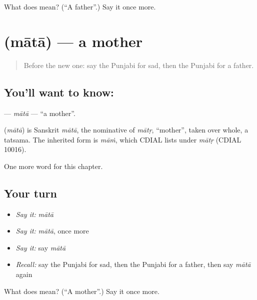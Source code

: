 \begin{tcolorbox}[breakable,colback=teal!4,colframe=teal!35!black,title={Before you move on}]
What does  mean? (\textquotedblleft{}A father\textquotedblright{}.) Say it once more.
\end{tcolorbox}
\section[\texorpdfstring{\pa{ਮਾਤਾ} (mātā)}{ਮਾਤਾ (mātā)}]{ (mātā) — a mother}

\label{lesson:PA-C53-mata}



\begin{quote}
Before the new one: say the Punjabi for sad, then the Punjabi for a father.
\end{quote}

\subsection*{You'll want to know: }
\textbf{} — \emph{mātā} — \textquotedblleft{}a mother\textquotedblright{}.

\begin{cousinweb}
\textbf{} (\emph{mātā}) is Sanskrit \emph{mātā}, the nominative of \emph{mātṛ}, \textquotedblleft{}mother\textquotedblright{}, taken over whole, a tatsama. The inherited form is \emph{māṁ}, which CDIAL lists under \emph{mātṛ} (CDIAL 10016).
\end{cousinweb}

\begin{grammarlens}[title={What you've built}]
One more word for this chapter.
\end{grammarlens}

\subsection*{Your turn}
\begin{itemize}
\raggedright
  \item \emph{Say it:} \emph{mātā}
  \item \emph{Say it:} \emph{mātā}, once more
  \item \emph{Say it:} say \emph{mātā}
  \item \emph{Recall:} say the Punjabi for sad, then the Punjabi for a father, then say \emph{mātā} again
\end{itemize}

\begin{tcolorbox}[breakable,colback=teal!4,colframe=teal!35!black,title={Before you move on}]
What does  mean? (\textquotedblleft{}A mother\textquotedblright{}.) Say it once more.
\end{tcolorbox}
